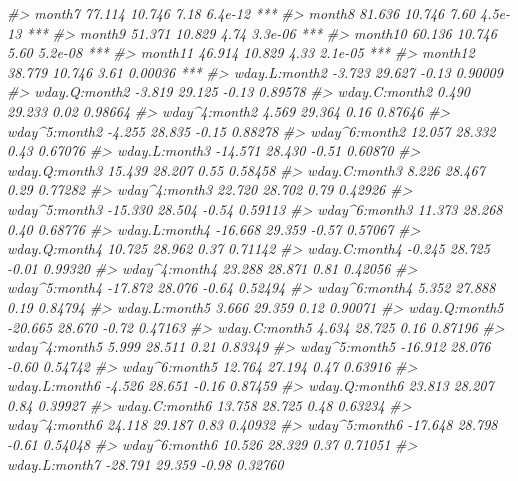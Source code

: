 \documentclass[]{book}
\newenvironment{Shaded}{\begin{snugshade}}{\end{snugshade}}
\newcommand{\CommentTok}[1]{\textcolor[rgb]{0.56,0.35,0.01}{\textit{#1}}}
\theoremstyle{plain}
\theoremstyle{remark}
\begin{document}
\begin{Shaded}
\begin{Highlighting}[]
\CommentTok{#> month7           77.114     10.746    7.18  6.4e-12 ***}
\CommentTok{#> month8           81.636     10.746    7.60  4.5e-13 ***}
\CommentTok{#> month9           51.371     10.829    4.74  3.3e-06 ***}
\CommentTok{#> month10          60.136     10.746    5.60  5.2e-08 ***}
\CommentTok{#> month11          46.914     10.829    4.33  2.1e-05 ***}
\CommentTok{#> month12          38.779     10.746    3.61  0.00036 ***}
\CommentTok{#> wday.L:month2    -3.723     29.627   -0.13  0.90009    }
\CommentTok{#> wday.Q:month2    -3.819     29.125   -0.13  0.89578    }
\CommentTok{#> wday.C:month2     0.490     29.233    0.02  0.98664    }
\CommentTok{#> wday^4:month2     4.569     29.364    0.16  0.87646    }
\CommentTok{#> wday^5:month2    -4.255     28.835   -0.15  0.88278    }
\CommentTok{#> wday^6:month2    12.057     28.332    0.43  0.67076    }
\CommentTok{#> wday.L:month3   -14.571     28.430   -0.51  0.60870    }
\CommentTok{#> wday.Q:month3    15.439     28.207    0.55  0.58458    }
\CommentTok{#> wday.C:month3     8.226     28.467    0.29  0.77282    }
\CommentTok{#> wday^4:month3    22.720     28.702    0.79  0.42926    }
\CommentTok{#> wday^5:month3   -15.330     28.504   -0.54  0.59113    }
\CommentTok{#> wday^6:month3    11.373     28.268    0.40  0.68776    }
\CommentTok{#> wday.L:month4   -16.668     29.359   -0.57  0.57067    }
\CommentTok{#> wday.Q:month4    10.725     28.962    0.37  0.71142    }
\CommentTok{#> wday.C:month4    -0.245     28.725   -0.01  0.99320    }
\CommentTok{#> wday^4:month4    23.288     28.871    0.81  0.42056    }
\CommentTok{#> wday^5:month4   -17.872     28.076   -0.64  0.52494    }
\CommentTok{#> wday^6:month4     5.352     27.888    0.19  0.84794    }
\CommentTok{#> wday.L:month5     3.666     29.359    0.12  0.90071    }
\CommentTok{#> wday.Q:month5   -20.665     28.670   -0.72  0.47163    }
\CommentTok{#> wday.C:month5     4.634     28.725    0.16  0.87196    }
\CommentTok{#> wday^4:month5     5.999     28.511    0.21  0.83349    }
\CommentTok{#> wday^5:month5   -16.912     28.076   -0.60  0.54742    }
\CommentTok{#> wday^6:month5    12.764     27.194    0.47  0.63916    }
\CommentTok{#> wday.L:month6    -4.526     28.651   -0.16  0.87459    }
\CommentTok{#> wday.Q:month6    23.813     28.207    0.84  0.39927    }
\CommentTok{#> wday.C:month6    13.758     28.725    0.48  0.63234    }
\CommentTok{#> wday^4:month6    24.118     29.187    0.83  0.40932    }
\CommentTok{#> wday^5:month6   -17.648     28.798   -0.61  0.54048    }
\CommentTok{#> wday^6:month6    10.526     28.329    0.37  0.71051    }
\CommentTok{#> wday.L:month7   -28.791     29.359   -0.98  0.32760    }

\end{Highlighting}
\end{Shaded}
\end{document}
